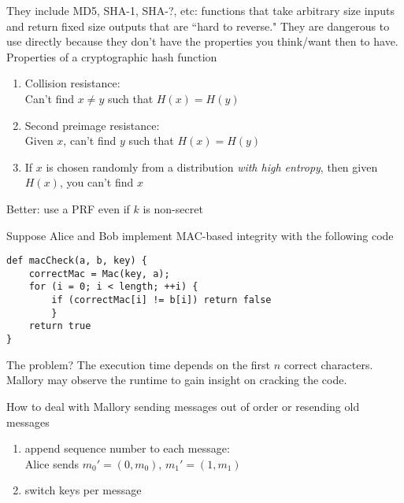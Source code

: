 They include MD5, SHA-1, SHA-?, etc: functions that take arbitrary size inputs and return
fixed size outputs that are ``hard to reverse." They are dangerous to use directly because
they don't have the properties you think/want then to have.\\

Properties of a cryptographic hash function
\begin{enumerate}
	\item Collision resistance:\\
		Can't find $x \neq y$ such that $H(x) = H(y)$
	\item Second preimage resistance:\\
		Given $x$, can't find $y$ such that $H(x) = H(y)$
	\item If $x$ is chosen randomly from a distribution \textit{with high entropy},
	then given $H(x)$, you can't find $x$
\end{enumerate}

Better: use a PRF even if $k$ is non-secret

Suppose Alice and Bob implement MAC-based integrity with the following code

\begin{verbatim}
def macCheck(a, b, key) {
    correctMac = Mac(key, a);
    for (i = 0; i < length; ++i) {
        if (correctMac[i] != b[i]) return false
        }
    return true
}
\end{verbatim}

The problem? The execution time depends on the first $n$ correct characters. Mallory may observe the runtime to
gain insight on cracking the code.

How to deal with Mallory sending messages out of order or resending old messages
\begin{enumerate}
\item append sequence number to each message:\\
        Alice sends $m_0' = (0, m_0)$, $m_1' = (1, m_1)$
\item switch keys per message
\end{enumerate}
